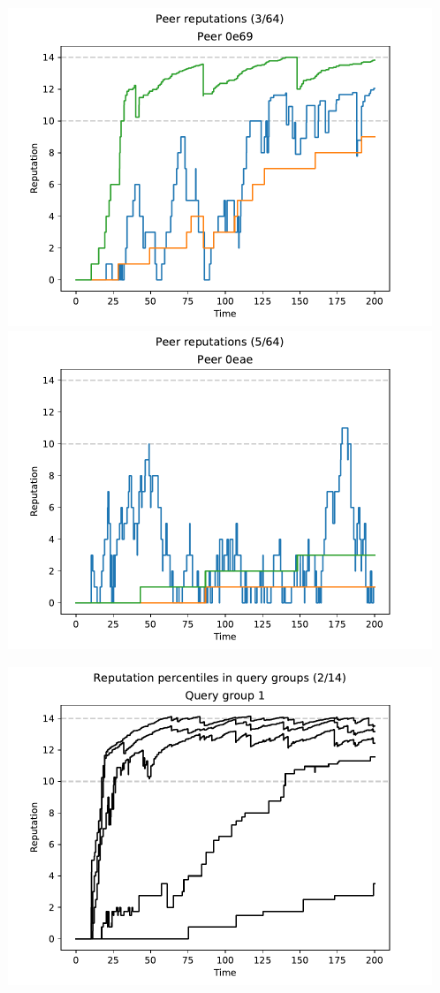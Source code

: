 \begin{figure}[t]
\centering
\includegraphics[width=0.5\columnwidth]{figures/selection_overlap_peer_reps_3_of_64}%
\includegraphics[width=0.5\columnwidth]{figures/selection_overlap_peer_reps_5_of_64}
\label{fig:selection_overlap_peer_reps}
\end{figure}

\begin{figure}[t]
\centering
\includegraphics[width=1\columnwidth]{figures/selection_overlap_rep_percs_2_of_14}
\label{fig:selection_overlap_rep_percs}
\end{figure}

